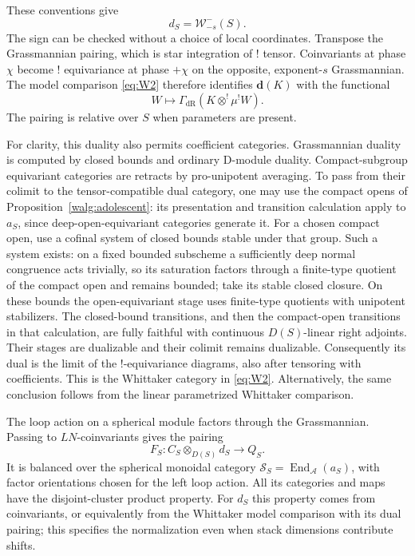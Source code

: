 These conventions give
\begin{equation}\label{loop:whittaker-coinvariants}
                     d_S=\mathcal W_{-s}^-(S).
\end{equation}
The sign can be
checked without a choice of local coordinates.  Transpose the
Grassmannian pairing, which is star integration of ! tensor.
Coinvariants at phase $\chi$ become ! equivariance at phase $+\chi$
on the opposite, exponent-$s$ Grassmannian.  The model comparison
\eqref{eq:W2} therefore identifies $\mathbf d(K)$ with the functional
\begin{equation}\label{eq:loop-whittaker-functional}
                 W\longmapsto
                  \Gamma_{\mathrm{dR}}(K\otimes^!\mu^!W).
\end{equation}
The pairing is relative over $S$ when parameters are present.

For clarity, this duality also permits coefficient categories.
Grassmannian duality is computed by closed bounds and ordinary
D-module duality.  Compact-subgroup equivariant categories are
retracts by pro-unipotent averaging.  To pass from their colimit to
the tensor-compatible dual category, one may use the compact opens
of Proposition~\ref{walg:adolescent}: its presentation and transition
calculation apply to $a_S$, since deep-open-equivariant categories
generate it.
For a chosen compact open, use a cofinal system of closed bounds
stable under that group.  Such a system exists: on a fixed bounded
subscheme a sufficiently deep normal congruence acts trivially,
so its saturation factors through a finite-type quotient of the
compact open and remains bounded; take its stable closed closure.
On these bounds the open-equivariant stage uses finite-type
quotients with unipotent stabilizers.  The closed-bound transitions,
and then the compact-open transitions in that calculation, are
fully faithful with continuous $D(S)$-linear right adjoints.
Their stages are dualizable and their colimit remains dualizable.
Consequently its dual is the limit of the !-equivariance diagrams,
also after tensoring with coefficients.  This is the Whittaker
category in \eqref{eq:W2}.  Alternatively, the same conclusion
follows from the linear parametrized Whittaker comparison.

The loop action on a spherical module factors through the
Grassmannian.  Passing to $LN$-coinvariants gives the pairing
\begin{equation}\label{eq:L3}
                     F_S:C_S\otimes_{D(S)}d_S\longrightarrow Q_S.
\end{equation}
It is balanced over the spherical monoidal category
$\mathcal S_S=\operatorname{End}_{\mathcal A}(a_S)$, with factor
orientations chosen for the left loop action.  All its categories
and maps have the disjoint-cluster product property.  For $d_S$
this property comes from coinvariants, or equivalently from the
Whittaker model comparison with its dual pairing; this specifies
the normalization even when stack dimensions contribute shifts.

